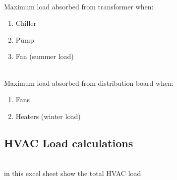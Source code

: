 \documentclass[12pt,fleqn]{book} %
\begin{document}
\\ Maximum load absorbed from transformer when:
 \begin{enumerate}
     \item Chiller
     \item Pump
     \item Fan (summer load)
 \end{enumerate}
\\ Maximum load absorbed from distribution board when:
\begin{enumerate}
     \item Fans
     \item Heaters (winter load)
 \end{enumerate}
 \subsection{HVAC Load calculations}
 \\ in this excel sheet show the total HVAC load
 
\end{document}
